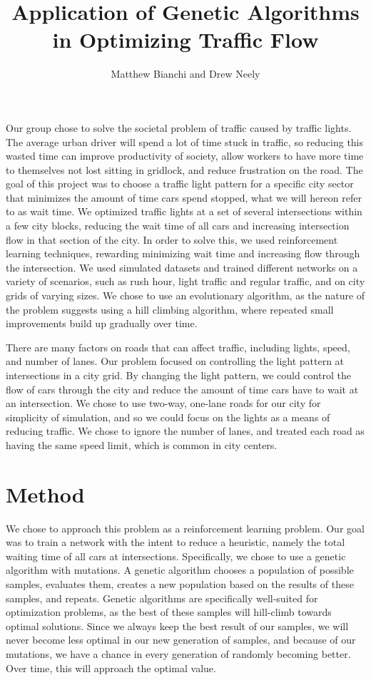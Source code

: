 \documentclass[12pt, letterpaper]{article}
\title{Application of Genetic Algorithms in Optimizing Traffic Flow}
\author{Matthew Bianchi and Drew Neely}
\begin{document}
\maketitle

Our group chose to solve the societal problem of traffic caused by traffic lights. 
The average urban driver will spend a lot of time stuck in traffic, so reducing this wasted time can improve productivity of society, allow workers to have more time to themselves not lost sitting in gridlock, and reduce frustration on the road.
The goal of this project was to choose a traffic light pattern for a specific city sector that minimizes the amount of time cars spend stopped, what we will hereon refer to as wait time.
We optimized traffic lights at a set of several intersections within a few city blocks, reducing the wait time of all cars and increasing intersection flow in that section of the city. 
In order to solve this, we used reinforcement learning techniques, rewarding minimizing wait time and increasing flow through the intersection. 
We used simulated datasets and trained different networks on a variety of scenarios, such as rush hour, light traffic and regular traffic, and on city grids of varying sizes. 
We chose to use an evolutionary algorithm, as the nature of the problem suggests using a hill climbing algorithm, where repeated small improvements build up gradually over time. 

There are many factors on roads that can affect traffic, including lights, speed, and number of lanes.
Our problem focused on controlling the light pattern at intersections in a city grid.
By changing the light pattern, we could control the flow of cars through the city and reduce the amount of time cars have to wait at an intersection.
We chose to use two-way, one-lane roads for our city for simplicity of simulation, and so we could focus on the lights as a means of reducing traffic.
We chose to ignore the number of lanes, and treated each road as having the same speed limit, which is common in city centers.

\section*{Method}

We chose to approach this problem as a reinforcement learning problem.
Our goal was to train a network with the intent to reduce a heuristic, namely the total waiting time of all cars at intersections.
Specifically, we chose to use a genetic algorithm with mutations.
A genetic algorithm chooses a population of possible samples, evaluates them, creates a new population based on the results of these samples, and repeats.
Genetic algorithms are specifically well-suited for optimization problems, as the best of these samples will hill-climb towards optimal solutions.
Since we always keep the best result of our samples, we will never become less optimal in our new generation of samples, and because of our mutations, we have a chance in every generation of randomly becoming better.
Over time, this will approach the optimal value.
\end{document}
